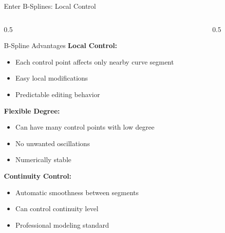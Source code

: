\begin{frame}{Enter B-Splines: Local Control}
  \begin{columns}
    \begin{column}{0.5\textwidth}
      \begin{conceptbox}{B-Spline Advantages}
        \footnotesize
        \textbf{Local Control:}
        \begin{itemize}
          \item Each control point affects only nearby curve segment
          \item Easy local modifications
          \item Predictable editing behavior
        \end{itemize}

        \textbf{Flexible Degree:}
        \begin{itemize}
          \item Can have many control points with low degree
          \item No unwanted oscillations
          \item Numerically stable
        \end{itemize}

        \textbf{Continuity Control:}
        \begin{itemize}
          \item Automatic smoothness between segments
          \item Can control continuity level
          \item Professional modeling standard
        \end{itemize}
      \end{conceptbox}
    \end{column}
    \begin{column}{0.5\textwidth}
      \begin{center}
\end{center}
\end{column}
\end{columns}
\end{frame}

